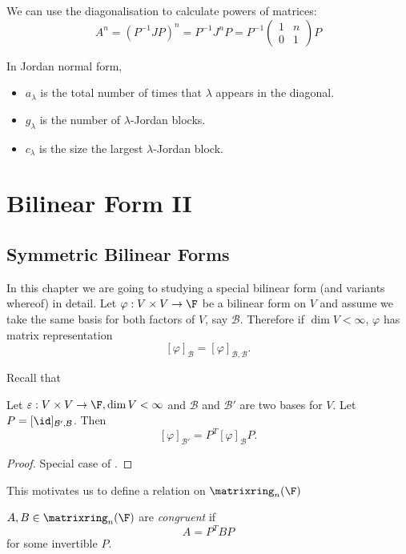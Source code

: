 \documentclass[a4paper]{article}
\newcommand*{\M}{\matrixring}
\newcommand*{\basis}{\mathcal}
\theoremstyle{definition}
\begin{document}
We can use the diagonalisation to calculate powers of matrices:
\[
  A^n = (P^{-1}JP)^n = P^{-1}J^nP = P^{-1}
  \begin{pmatrix}
    1 & n \\
    0 & 1
  \end{pmatrix}
  P
\]

\begin{remark}
  In Jordan normal form,
  \begin{itemize}
  \item \(a_\lambda\) is the total number of times that \(\lambda\) appears in the diagonal.
  \item \(g_\lambda\) is the number of \(\lambda\)-Jordan blocks.
  \item \(c_\lambda\) is the size the largest \(\lambda\)-Jordan block.
  \end{itemize}
\end{remark}

\section{Bilinear Form II}

\subsection{Symmetric Bilinear Forms}

In this chapter we are going to studying a special bilinear form (and variants whereof) in detail. Let \(\varphi: V \times V \to \F\) be a bilinear form on \(V\) and assume we take the same basis for both factors of \(V\), say \(\basis B\). Therefore if \(\dim V < \infty\), \(\varphi\) has matrix representation
\[
  [\varphi]_{\basis B} = [\varphi]_{\basis B, \basis B}.
\]

Recall that
\begin{lemma}
  Let \(\varepsilon: V \times V \to \F, \dim V < \infty\) and \(\basis B\) and \(\basis B'\) are two bases for \(V\). Let \(P = [\id]_{\basis B', \basis B}\). Then
  \[
    [\varphi]_{\basis B'} = P^T[\varphi]_{\basis B}P.
  \]
\end{lemma}

\begin{proof}
  Special case of .
\end{proof}

This motivates us to define a relation on \(\M_n(\F)\)

\begin{definition}[Congruency]
  \(A, B \in \M_n(\F)\) are \emph{congruent} if
  \[
    A = P^TBP
  \]
  for some invertible \(P\).
\end{definition}
\end{document}
